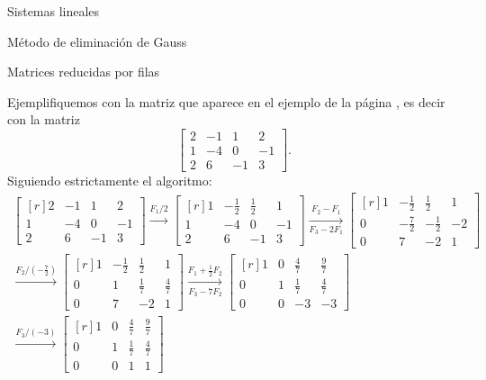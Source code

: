 \begin{chapter}{Sistemas lineales}
\begin{section}{Método de eliminación de Gauss }
\begin{subsection}{Matrices reducidas por filas}
                          
                \begin{ejemplo*} Ejemplifiquemos con la matriz que aparece en el ejemplo de la página \pageref{ejemplo2.11},  es decir con la matriz
                    $$
                    \begin{bmatrix} 2& -1&1& 2 \\ 1&-4 &0&-1 \\ 2&6&-1&3 \end{bmatrix}.
                    $$
                    Siguiendo estrictamente el algoritmo:
                    \begin{multline*}
                    \begin{bmatrix*}[r] 2& -1&1& 2 \\ 1&-4 &0&-1 \\ 2&6&-1&3 \end{bmatrix*}
                    \stackrel{F_1/2}{\longrightarrow} 
                    \begin{bmatrix*}[r] 1& -\frac12&\frac12& 1 \\ 1&-4 &0&-1 \\ 2&6&-1&3 \end{bmatrix*}
                    \underset{F_3-2F_1}{\stackrel{F_2- F_1}{\longrightarrow}} 
                    \begin{bmatrix*}[r] 1& -\frac12&\frac12& 1 \\ 0&-\frac72 &-\frac12&-2 \\ 0&7&-2&1 \end{bmatrix*}
                    \\
                    \stackrel{F_2/(-\frac72)}{\longrightarrow} 
                    \begin{bmatrix*}[r] 1& -\frac12&\frac12& 1 \\ 0&1 &\frac17&\frac47 \\ 0&7&-2&1 \end{bmatrix*}
                    \underset{F_3-7F_2}{\stackrel{F_1 +\frac12 F_2}{\longrightarrow}} 
                    \begin{bmatrix*}[r] 1& 0&\frac47& \frac97 \\ 0&1 &\frac17&\frac47 \\ 0&0&-3&-3 \end{bmatrix*}
                    \\
                    \stackrel{F_3/(-3)}{\longrightarrow} 
                    \begin{bmatrix*}[r] 1& 0&\frac47& \frac97 \\ 0&1 &\frac17&\frac47 \\ 0&0&1&1 \end{bmatrix*}

\end{multline*}
\end{ejemplo*}
\end{subsection}
\end{section}
\end{chapter}
